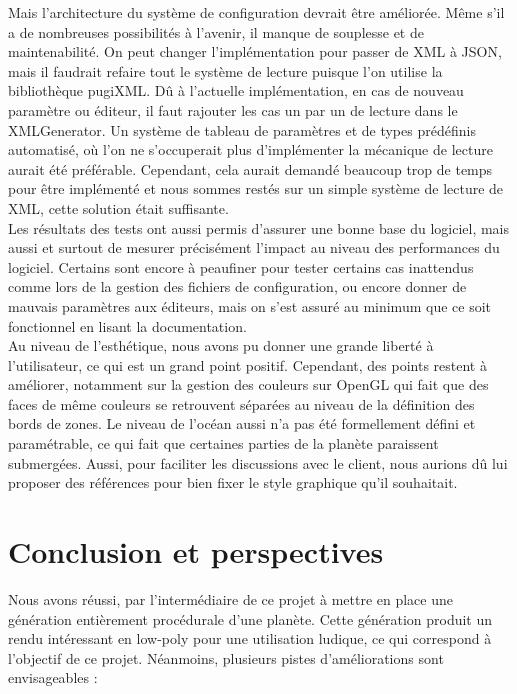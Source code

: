 \documentclass[a4paper]{article}
\begin{document}
Mais l'architecture du système de configuration devrait être améliorée. Même s'il a de nombreuses possibilités à l'avenir, il manque de souplesse et de maintenabilité. On peut changer l'implémentation pour passer de XML à JSON, mais il faudrait refaire tout le système de lecture puisque l'on utilise la bibliothèque pugiXML. Dû à l'actuelle implémentation, en cas de nouveau paramètre ou éditeur, il faut rajouter les cas un par un de lecture dans le XMLGenerator. Un système de tableau de paramètres et de types prédéfinis automatisé, où l'on ne s'occuperait plus d'implémenter la mécanique de lecture aurait été préférable. Cependant, cela aurait demandé beaucoup trop de temps pour être implémenté et nous sommes restés sur un simple système de lecture de XML, cette solution était suffisante. \\

Les résultats des tests ont aussi permis d'assurer une bonne base du logiciel, mais aussi et surtout de mesurer précisément l'impact au niveau des performances du logiciel. Certains sont encore à peaufiner pour tester certains cas inattendus comme lors de la gestion des fichiers de configuration, ou encore donner de mauvais paramètres aux éditeurs, mais on s'est assuré au minimum que ce soit fonctionnel en lisant la documentation.\\

Au niveau de l'esthétique, nous avons pu donner une grande liberté à l'utilisateur, ce qui est un grand point positif. Cependant, des points restent à améliorer, notamment sur la gestion des couleurs sur OpenGL qui fait que des faces de même couleurs se retrouvent séparées au niveau de la définition des bords de zones. Le niveau de l'océan aussi n'a pas été formellement défini et paramétrable, ce qui fait que certaines parties de la planète paraissent submergées. Aussi, pour faciliter les discussions avec le client, nous aurions dû lui proposer des références pour bien fixer le style graphique qu'il souhaitait.\\

\newpage
\section{Conclusion et perspectives}

Nous avons réussi, par l'intermédiaire de ce projet à mettre en place une génération entièrement procédurale d'une planète. Cette génération produit un rendu intéressant en low-poly pour une utilisation ludique, ce qui correspond à l'objectif de ce projet. Néanmoins, plusieurs pistes d'améliorations sont envisageables : \\
\end{document}
